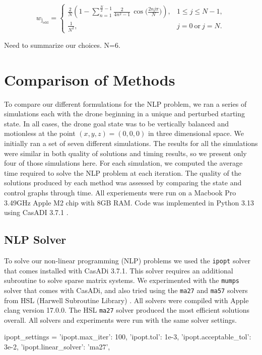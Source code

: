 \documentclass[]{article}
\begin{document}
	\[
        w_{\mathrm{j_{odd}}} =
        \begin{cases}
        \displaystyle
        \frac{2}{N}\!\left(
        1 - \sum_{n=1}^{\frac{N}{2}-1} \frac{2}{4n^{2}-1}\,
        \cos\!\Big(\tfrac{2 n j \pi}{N}\Big)
        \right), & 1 \le j \le N-1, \\[2ex]
        \displaystyle \frac{1}{N^{2}}, & j=0\ \text{or}\ j=N.
        \end{cases}
        \]

Need to summarize our choices.  N=6.

\section*{Comparison of Methods}

To compare our different formulations for the NLP problem, we ran a series of simulations each with the drone beginning in a unique and perturbed starting state. In all cases, the drone goal state was to be vertically balanced and motionless at the point $(x,y,z) = (0, 0, 0)$ in three dimensional space. We initially ran a set of seven different simulations. The results for all the simulations were similar in both quality of solutions and timing results, so we present only four of those simulations here.  For each simulation, we computed the average time required to solve the NLP problem at each iteration. The quality of the solutions produced by each method was assessed by comparing the state and control graphs through time. All experiements were run on a Macbook Pro  3.49GHz Apple M2 chip with 8GB RAM. Code was implemented in Python 3.13 using CasADI 3.7.1 \citep{Andersson2018}. 
	
	\subsection*{NLP Solver}
	To solve our non-linear programming (NLP) problems we used the \texttt{ipopt} solver \citep{ipopt} that comes installed with CasADi 3.7.1.  This solver requires an additional subroutine to  solve sparse matrix systems. We experimented with the \texttt{mumps}  solver that comes with CasADi, and also tried using the  \texttt{ma27} and  \texttt{ma57} solvers  from HSL (Harwell Subroutine Library) \citep{hsl}. All solvers were compiled with Apple clang version 17.0.0. The HSL \texttt{ma27} solver produced the most efficient solutions overall. All solvers and experiments were run with the same solver settings.
	\vspace{\baselineskip}
	\begin{python}
        ipopt_settings = {
			'ipopt.max_iter': 100,                  
			'ipopt.tol': 1e-3,                      	
			'ipopt.acceptable_tol': 3e-2,
			'ipopt.linear_solver': 'ma27',
		}
	\end{python}
\end{document}
